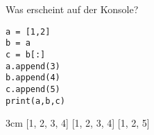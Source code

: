 \question[3]
Was erscheint auf der Konsole?
\begin{lstlisting}
a = [1,2]
b = a
c = b[:]
a.append(3)
b.append(4)
c.append(5)
print(a,b,c)
\end{lstlisting}
\begin{solutionbox}{3cm}
[1, 2, 3, 4] [1, 2, 3, 4] [1, 2, 5]
\end{solutionbox}
